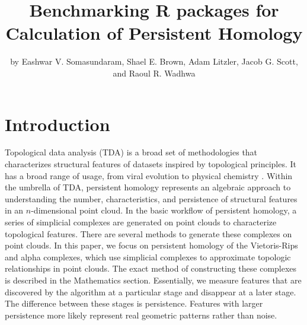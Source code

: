 \title{Benchmarking R packages for Calculation of Persistent Homology}
\author{by Eashwar V. Somasundaram, Shael E. Brown, Adam Litzler, Jacob G. Scott, and Raoul R. Wadhwa}

\maketitle


\hypertarget{introduction}{%
\section{Introduction}\label{introduction}}

Topological data analysis (TDA) is a broad set of methodologies that
characterizes structural features of datasets inspired by topological
principles. It has a broad range of usage, from viral evolution to
physical chemistry \citep{TDA-Viral,TDA-PChem}. Within the umbrella of
TDA, persistent homology represents an algebraic approach to
understanding the number, characteristics, and persistence of structural
features in an \(n\)-dimensional point cloud. In the basic workflow of
persistent homology, a series of simplicial complexes are generated on
point clouds to characterize topological features. There are several
methods to generate these complexes on point clouds. In this paper, we
focus on persistent homology of the Vietoris-Rips and alpha complexes,
which use simplicial complexes to approximate topologic relationships in
point clouds. The exact method of constructing these complexes is
described in the Mathematics section. Essentially, we measure features
that are discovered by the algorithm at a particular stage and disappear
at a later stage. The difference between these stages is persistence. Features with larger persistence more likely represent real
geometric patterns rather than noise.

